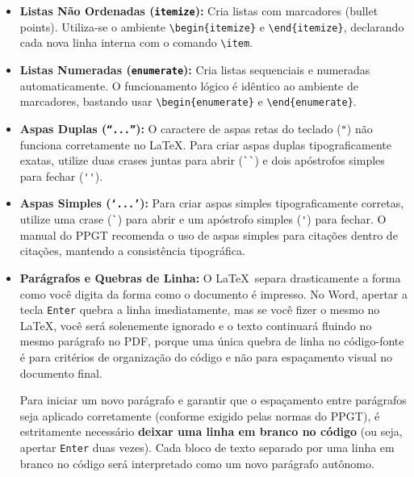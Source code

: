 \documentclass[12pt, a4paper]{article}
\begin{document}
\begin{itemize}
    \begin{atencao}
    Atenção ao rigor do PPGT: o manual especifica que palavras que se desejam dar destaque devem ser escritas entre aspas duplas ou com as iniciais em maiúsculo, e não com o negrito, que é reservado estritamente para títulos de seções, numeração de ilustrações e elementos estruturais.
    \end{atencao}

    \item \textbf{Listas Não Ordenadas (\texttt{itemize}):} Cria listas com marcadores (bullet points). Utiliza-se o ambiente \texttt{\textbackslash begin\{itemize\}} e \texttt{\textbackslash end\{itemize\}}, declarando cada nova linha interna com o comando \texttt{\textbackslash item}.
    \item \textbf{Listas Numeradas (\texttt{enumerate}):} Cria listas sequenciais e numeradas automaticamente. O funcionamento lógico é idêntico ao ambiente de marcadores, bastando usar \texttt{\textbackslash begin\{enumerate\}} e \texttt{\textbackslash end\{enumerate\}}.
    \item \textbf{Aspas Duplas (\texttt{``...''}):} O caractere de aspas retas do teclado (\verb|"|) não funciona corretamente no LaTeX. Para criar aspas duplas tipograficamente exatas, utilize duas crases juntas para abrir (\verb|``|) e dois apóstrofos simples para fechar (\verb|''|).
    \item \textbf{Aspas Simples (\texttt{`...'}):} Para criar aspas simples tipograficamente corretas, utilize uma crase (\verb|`|) para abrir e um apóstrofo simples (\verb|'|) para fechar. O manual do PPGT recomenda o uso de aspas simples para citações dentro de citações, mantendo a consistência tipográfica.
    \item \textbf{Parágrafos e Quebras de Linha:} O \LaTeX \ separa drasticamente a forma como você digita da forma como o documento é impresso. No Word, apertar a tecla \texttt{Enter} quebra a linha imediatamente, mas se você fizer o mesmo no \LaTeX, você será solenemente ignorado e o texto continuará fluindo no mesmo parágrafo no PDF, porque uma única quebra de linha no código-fonte é para critérios de organização do código e não para espaçamento visual no documento final.

    Para iniciar um novo parágrafo e garantir que o espaçamento entre parágrafos seja aplicado corretamente (conforme exigido pelas normas do PPGT), é estritamente necessário \textbf{deixar uma linha em branco no código} (ou seja, apertar \texttt{Enter} duas vezes). Cada bloco de texto separado por uma linha em branco no código será interpretado como um novo parágrafo autônomo.


\end{itemize}
\end{document}
